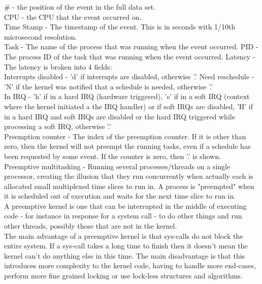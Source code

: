 \documentclass[11pt, a4paper, oneside]{article}
\theoremstyle{definition}
\begin{document}
    $\#$ - the position of the event in the full data set.\\
    CPU - the CPU that the event occurred on.\\
    Time Stamp - The timestamp of the event. This is in seconds with 1/10th microsecond resolution.\\
    Task - The name of the process that was running when the event occurred.
    PID - The process ID of the task that was running when the event occurred.
    Latency - The latency is broken into 4 fields:\\
        Interrupts disabled - 'd' if interrupts are disabled, otherwise '.'
        Need reschedule - 'N' if the kernel was notified that a schedule is needed, otherwise '.'\\
        In IRQ - 'h' if in a hard IRQ (hardware triggered), 's' if in a soft IRQ (context where the kernel initiated a the IRQ handler) or if soft IRQs are disabled, 'H' if in a hard IRQ and soft IRQs are disabled or the hard IRQ triggered while processing a soft IRQ, otherwise '.'\\
        Preemption counter - The index of the preemption counter. If it is other than zero, then the kernel will not preempt the running tasks, even if a schedule has been requested by some event. If the counter is zero, then '.' is shown. \\



Preemptive multitasking - Running several processes/threads on a single processor, creating the illusion that they run concurrently when actually each is allocated small multiplexed time slices to run in. A process is "preempted" when it is scheduled out of execution and waits for the next time slice to run in.\\

A preemptive kernel is one that can be interrupted in the middle of executing code - for instance in response for a system call - to do other things and run other threads, possibly those that are not in the kernel.\\

The main advantage of a preemptive kernel is that sys-calls do not block the entire system. If a sys-call takes a long time to finish then it doesn't mean the kernel can't do anything else in this time. The main disadvantage is that this introduces more complexity to the kernel code, having to handle more end-cases, perform more fine grained locking or use lock-less structures and algorithms.
\\
\end{document}
